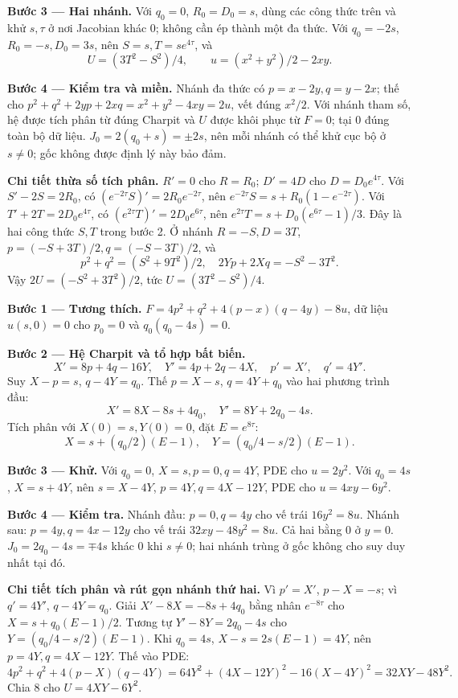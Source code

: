 \textbf{Bước 3 — Hai nhánh.} Với $q_0=0$, $R_0=D_0=s$, dùng các công thức trên và khử $s,\tau$ ở nơi Jacobian khác 0; không cần ép thành một đa thức. Với $q_0=-2s$, $R_0=-s,D_0=3s$, nên $S=s,T=se^{4\tau}$, và
\[U=(3T^2-S^2)/4,\qquad u=(x^2+y^2)/2-2xy.\]

\textbf{Bước 4 — Kiểm tra và miền.} Nhánh đa thức có $p=x-2y,q=y-2x$; thế cho $p^2+q^2+2yp+2xq=x^2+y^2-4xy=2u$, vết đúng $x^2/2$. Với nhánh tham số, hệ được tích phân từ đúng Charpit và $U$ được khôi phục từ $F=0$; tại 0 đúng toàn bộ dữ liệu. $J_0=2(q_0+s)=\pm2s$, nên mỗi nhánh có thể khử cục bộ ở $s\ne0$; gốc không được định lý này bảo đảm.

\textbf{Chi tiết thừa số tích phân.} $R'=0$ cho $R=R_0$; $D'=4D$ cho $D=D_0e^{4\tau}$. Với $S'-2S=2R_0$, có $(e^{-2\tau}S)'=2R_0e^{-2\tau}$, nên $e^{-2\tau}S=s+R_0(1-e^{-2\tau})$. Với $T'+2T=2D_0e^{4\tau}$, có $(e^{2\tau}T)'=2D_0e^{6\tau}$, nên $e^{2\tau}T=s+D_0(e^{6\tau}-1)/3$. Đây là hai công thức $S,T$ trong bước 2. Ở nhánh $R=-S,D=3T$, $p=(-S+3T)/2,q=(-S-3T)/2$, và
\[p^2+q^2=(S^2+9T^2)/2,\quad 2Yp+2Xq=-S^2-3T^2.\]
Vậy $2U=(-S^2+3T^2)/2$, tức $U=(3T^2-S^2)/4$.

\textbf{Bước 1 — Tương thích.} $F=4p^2+q^2+4(p-x)(q-4y)-8u$, dữ liệu $u(s,0)=0$ cho $p_0=0$ và $q_0(q_0-4s)=0$.

\textbf{Bước 2 — Hệ Charpit và tổ hợp bất biến.}
\[X'=8p+4q-16Y,\quad Y'=4p+2q-4X,\quad p'=X',\quad q'=4Y'.\]
Suy $X-p=s$, $q-4Y=q_0$. Thế $p=X-s$, $q=4Y+q_0$ vào hai phương trình đầu:
\[X'=8X-8s+4q_0,\quad Y'=8Y+2q_0-4s.\]
Tích phân với $X(0)=s,Y(0)=0$, đặt $E=e^{8\tau}$:
\[X=s+(q_0/2)(E-1),\quad Y=(q_0/4-s/2)(E-1).\]

\textbf{Bước 3 — Khử.} Với $q_0=0$, $X=s,p=0,q=4Y$, PDE cho $u=2y^2$. Với $q_0=4s$, $X=s+4Y$, nên $s=X-4Y$, $p=4Y,q=4X-12Y$, PDE cho $u=4xy-6y^2$.

\textbf{Bước 4 — Kiểm tra.} Nhánh đầu: $p=0,q=4y$ cho vế trái $16y^2=8u$. Nhánh sau: $p=4y,q=4x-12y$ cho vế trái $32xy-48y^2=8u$. Cả hai bằng 0 ở $y=0$. $J_0=2q_0-4s=\mp4s$ khác 0 khi $s\ne0$; hai nhánh trùng ở gốc không cho suy duy nhất tại đó.

\textbf{Chi tiết tích phân và rút gọn nhánh thứ hai.} Vì $p'=X'$, $p-X=-s$; vì $q'=4Y'$, $q-4Y=q_0$. Giải $X'-8X=-8s+4q_0$ bằng nhân $e^{-8\tau}$ cho $X=s+q_0(E-1)/2$. Tương tự $Y'-8Y=2q_0-4s$ cho $Y=(q_0/4-s/2)(E-1)$. Khi $q_0=4s$, $X-s=2s(E-1)=4Y$, nên $p=4Y,q=4X-12Y$. Thế vào PDE:
\[4p^2+q^2+4(p-X)(q-4Y)
=64Y^2+(4X-12Y)^2-16(X-4Y)^2
=32XY-48Y^2.\]
Chia $8$ cho $U=4XY-6Y^2$.

